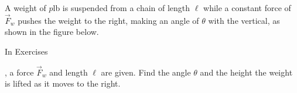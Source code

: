 {\noindent A weight of $p$lb is suspended from a chain of length $\ell$ while a constant force of $\vec F_w$ pushes the weight to the right, making an angle of $\theta$ with the vertical, as shown in the figure below. 
\begin{center}
\end{center}
In Exercises}
{,  a force $\vec F_w$ and length $\ell$ are given. Find the angle $\theta$ and the height the weight is lifted as it moves to the right.
}
